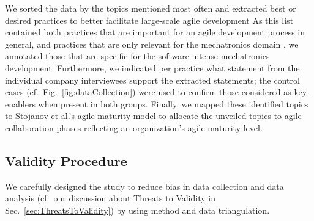 \documentclass[10pt,a4paper]{IEEEtran} %
\begin{document}
We sorted the data by the topics mentioned most often and extracted best or desired practices 
to better facilitate large-scale agile development
As this list contained both practices that are important for 
an agile development process in general, and practices that are only relevant for the mechatronics domain , we annotated those that are specific for the software-intense mechatronics development. %
Furthermore, we indicated per practice what statement from the individual company
interviewees support the extracted statements; the control cases (cf.~Fig.~\ref{fig:dataCollection})
were used to confirm those considered as key-enablers when present in both groups.
Finally, we mapped these identified topics to Stojanov et al.'s agile maturity
model \cite{stojanov_maturity_2015} to allocate the unveiled topics to agile
collaboration phases reflecting an organization's agile maturity level.

\begin{comment}
\begin{itemize}
\item We took the collected data and applied coding in Excel
\item We clustered the data into product and process
\item We went through the data to extract best practices or the desired practices to be used
\item We complemented the data from the individual interviews with data from the individual company workshops
\item We marked topics that are mainly concerned with the mechatronics domain and brought down the list from 106 to 81 that are best practices in agile and 25 that are only related to mechatronics
\item We identified which of the five principles the 25 topics support and estimated (\uek{to be validated with Jens and Jonas}) at which maturity the items are located
\end{itemize}
\end{comment}


\subsection{Validity Procedure}
\label{sec:ValidityProcedure}
We carefully designed the study to reduce bias in data collection and data analysis (cf.~our discussion about Threats to Validity in Sec.~\ref{sec:ThreatsToValidity})
by using method and data triangulation. 
\end{document}
